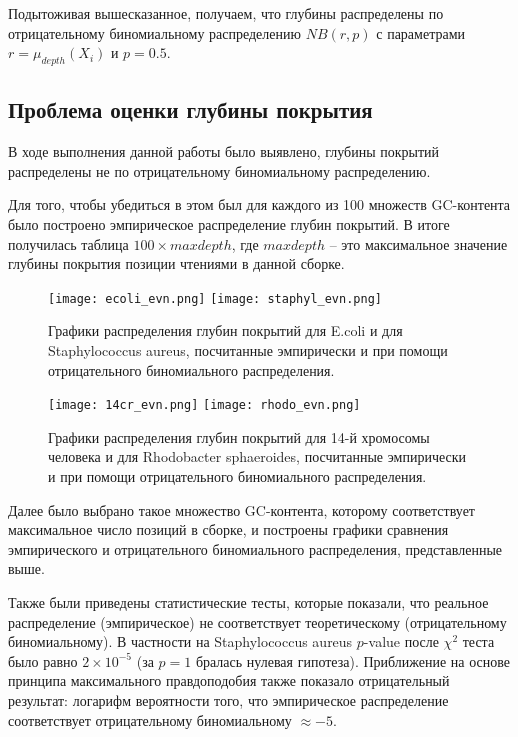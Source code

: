 Подытоживая вышесказанное, получаем, что глубины распределены по отрицательному биномиальному распределению $NB(r, p)$ с параметрами $r = \mu_{depth}(X_i)$ и $p = 0.5$.

\subsection{Проблема оценки глубины покрытия}
В ходе выполнения данной работы было выявлено, глубины покрытий распределены не по отрицательному биномиальному распределению.

Для того, чтобы убедиться в этом был для каждого из 100 множеств GC-контента было построено эмпирическое распределение глубин покрытий. В итоге получилась таблица $100\times maxdepth$, где $maxdepth$ -- это максимальное значение глубины покрытия позиции чтениями в данной сборке. 

\begin{figure}[H]
\texttt{[image: ecoli\_evn.png]}
\texttt{[image: staphyl\_evn.png]}
\caption{Графики распределения глубин покрытий для E.coli и для Staphylococcus aureus, посчитанные эмпирически и при помощи отрицательного биномиального распределения.}
\label{fig:NBvsEmp1}
\end{figure}

\begin{figure}[H]
\texttt{[image: 14cr\_evn.png]}
\texttt{[image: rhodo\_evn.png]}
\caption{Графики распределения глубин покрытий для 14-й хромосомы человека и для Rhodobacter sphaeroides, посчитанные эмпирически и при помощи отрицательного биномиального распределения.}
\label{fig:NBvsEmp2}
\end{figure}

Далее было выбрано такое множество GC-контента, которому соответствует максимальное число позиций в сборке, и построены графики сравнения эмпирического и отрицательного биномиального распределения, представленные выше.

Также были приведены статистические тесты, которые показали, что реальное распределение (эмпирическое) не соответствует теоретическому (отрицательному биномиальному). В частности на Staphylococcus aureus $p$-value после $\chi^2$ теста было равно $2\times 10^{-5}$ (за $p=1$ бралась нулевая гипотеза). Приближение на основе принципа максимального правдоподобия также показало отрицательный результат: логарифм вероятности того, что эмпирическое распределение соответствует отрицательному биномиальному $\approx-5$.

